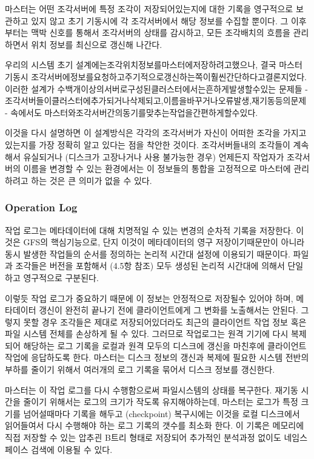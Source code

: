 \documentclass[twocolumn]{article}
\begin{document}
 마스터는 어떤 조각서버에 특정 조각이 저장되어있는지에 대한 기록을 영구적으로 보관하고 있지 않고 초기 기동시에 각 조각서버에서 해당 정보를 수집할 뿐이다. 그 이후부터는 맥박 신호를 통해서 조각서버의 상태를 감시하고, 모든 조각배치의 흐름을 관리하면서 위치 정보를 최신으로 갱신해 나간다.

 우리의 시스템 초기 설계에는조각위치정보를마스터에저장하려고했으나, 결국 마스터 기동시 조각서버에정보를요청하고주기적으로갱신하는쪽이훨씬간단하다고결론지었다. 이러한 설계가 수백개이상의서버로구성된클러스터에서는흔하게발생할수있는 문제들 - 조각서버들이클러스터에추가되거나삭제되고,이름을바꾸거나오류발생,재기동등의문제 - 속에서도 마스터와조각서버간의동기를맞추는작업을간편하게할수있다.

 이것을 다시 설명하면 이 설계방식은 각각의 조각서버가 자신이 어떠한 조각을 가지고 있는지를 가장 정확히 알고 있다는 점을 착안한 것이다.  조각서버들내의 조각들이 계속해서 유실되거나 (디스크가 고장나거나 사용 불가능한 경우) 언제든지 작업자가 조각서버의 이름을 변경할 수 있는 환경에서는 이 정보들의 통합을 고정적으로 마스터에 관리하려고 하는 것은 큰 의미가 없을 수 있다.

\subsubsection{Operation Log}

 작업 로그는 메타데이터에 대해 치명적일 수 있는 변경의 순차적 기록을 저장한다.  이것은 GFS의 핵심기능으로, 단지 이것이 메타데이터의 영구 저장이기때문만이 아니라 동시 발생한 작업들의 순서를 정의하는 논리적 시간대 설정에 이용되기 때문이다.  파일과 조각들은 버전을 포함해서 (4.5항 참조) 모두 생성된 논리적 시간대에 의해서 단일하고 영구적으로 구분된다.

  이렇듯 작업 로그가 중요하기 때문에 이 정보는 안정적으로 저장될수 있어야 하며, 메타데이터 갱신이 완전히 끝나기 전에 클라이언트에게 그 변화를 노출해서는 안된다.  그렇지 못할 경우 조각들은 제대로 저장되어있더라도 최근의 클라이언트 작업 정보 혹은 파일 시스템 전체를 손상하게 될 수 있다.  그러므로 작업로그는 원격 기기에 다시 복제되어 해당하는 로그 기록을 로컬과 원격 모두의 디스크에 갱신을 마친후에 클라이언트 작업에 응답하도록 한다.  마스터는 디스크 정보의 갱신과 복제에 필요한 시스템 전반의 부하를 줄이기 위해서 여러개의 로그 기록을 묶어서 디스크 정보를 갱신한다.

 마스터는 이 작업 로그를 다시 수행함으로써 파일시스템의 상태를 복구한다.  재기동 시간을 줄이기 위해서는 로그의 크기가 작도록 유지해야하는데, 마스터는 로그가 특정 크기를 넘어설때마다 기록을 해두고 (checkpoint) 복구시에는 이것을 로컬 디스크에서 읽어들여서 다시 수행해야 하는 로그 기록의 갯수를 최소화 한다.  이 기록은 메모리에 직접 저장할 수 있는 압추괸 B트리 형태로 저장되어 추가적인 분석과정 없이도 네임스페이스 검색에 이용될 수 있다.
\end{document}
